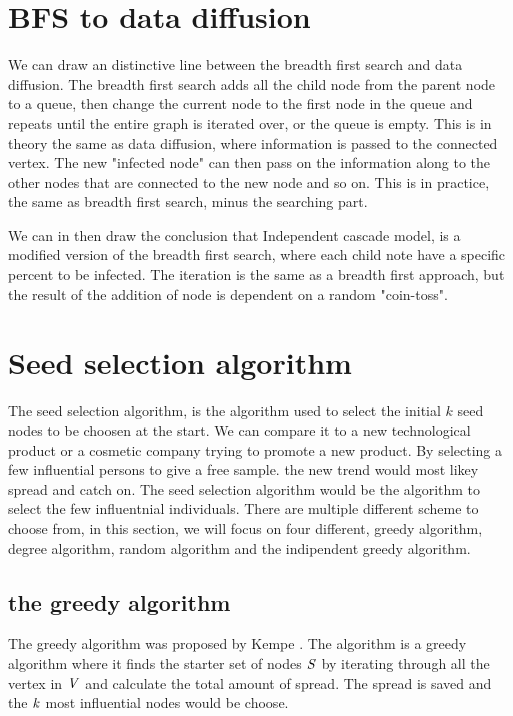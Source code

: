 {\section{BFS to data diffusion}
We can draw an distinctive line between the breadth first search and data diffusion. The breadth first search adds all the child node from the parent node to a queue, then change the current node to the first node in the queue and repeats until the entire graph is iterated over, or the queue is empty. This is in theory the same as data diffusion, where information is passed to the connected vertex. The new "infected node" can then pass on the information along to the other nodes that are connected to the new node and so on. This is in practice, the same as breadth first search, minus the searching part. 

We can in then draw the conclusion that Independent cascade model, is a modified version of the breadth first search, where each child note have a specific percent to be infected. The iteration is the same as a breadth first approach, but the result of the addition of node is dependent on a random "coin-toss".


\section{Seed selection algorithm}
The seed selection algorithm, is the algorithm used to select the initial $k$ seed nodes to be choosen at the start. We can compare it to a new technological product or a cosmetic company trying to promote a new product. By selecting a few influential persons to give a free sample. the new trend would most likey spread and catch on. The seed selection algorithm would be the algorithm to select the few influentnial individuals. There are multiple different scheme to choose from, in this section, we will focus on four different, greedy algorithm, degree algorithm, random algorithm and the indipendent greedy algorithm.

\subsection{the greedy algorithm}
The  greedy algorithm was proposed by Kempe \cite{MaximizeSpread2015}. The algorithm is a greedy algorithm where it finds the starter set of nodes $\it{S}$ by iterating through all the vertex in $\it{V}$ and calculate the total amount of spread. The spread is saved and the $\it{k}$ most influential nodes would be choose.

}
